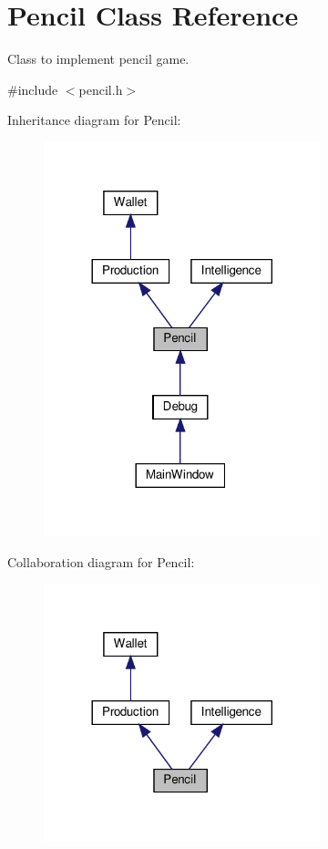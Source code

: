 \hypertarget{classPencil}{}\section{Pencil Class Reference}
\label{classPencil}


Class to implement pencil game.  




{\ttfamily \#include $<$pencil.\+h$>$}



Inheritance diagram for Pencil\+:\nopagebreak
\begin{figure}[H]
\begin{center}
\leavevmode
\includegraphics[width=228pt]{classPencil__inherit__graph}
\end{center}
\end{figure}


Collaboration diagram for Pencil\+:\nopagebreak
\begin{figure}[H]
\begin{center}
\leavevmode
\includegraphics[width=228pt]{classPencil__coll__graph}
\end{center}
\end{figure}
